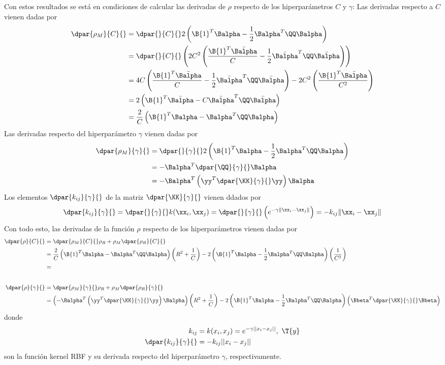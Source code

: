 %
Con estos resultados se está en condiciones de calcular las derivadas de
$\rho$ respecto de los hiperparámetros $C$ y $\gamma$:
Las derivadas respecto a $C$ vienen dadas por
%
\begin{align}
    \dpar{\rho_M}{C}{}
    &= \dpar{}{C}{}2\left(  \B{1}^T\Balpha-\frac{1}{2}\Balpha^T\QQ\Balpha \right) \\
    &= \dpar{}{C}{}\left( 2C^2\left(\frac{\B{1}^T\bar{\Balpha}}{C} -
    \frac{1}{2}\bar{\Balpha}^T\QQ\bar{\Balpha}\right)
    \right) \\
    &= 4C \left(\frac{\B{1}^T\bar{\Balpha}}{C} -
    \frac{1}{2}\bar{\Balpha}^T\QQ\bar{\Balpha}\right) - 2C^2 \left(\frac{\B{1}^T\bar{\Balpha}}{C^2} \right) \\
    &= 2\left(\B{1}^T\bar{\Balpha} - C \bar{\Balpha}^T\QQ\bar{\Balpha}\right) \\
    &= \frac{2}{C} \left(\B{1}^T\Balpha - \Balpha^T\QQ\Balpha\right)
\end{align}
%
Las derivadas respecto del hiperparámetro $\gamma$ vienen dadas por
%
\begin{align}
    \dpar{\rho_M}{\gamma}{}
    &= \dpar{}{\gamma}{} 2\left(  \B{1}^T\Balpha-\frac{1}{2}\Balpha^T\QQ\Balpha \right) \\
    &= - \Balpha^T \dpar{\QQ}{\gamma}{}\Balpha \\
    & = - \Balpha^T \left(\yy^T \dpar{\KK}{\gamma}{}\yy\right) \Balpha
\end{align}
%
Los elementos $\dpar{k_{ij}}{\gamma}{}$ de la matriz $\dpar{\KK}{\gamma}{}$
vienen ddados por
%
\begin{align}
  \dpar{k_{ij}}{\gamma}{}
  = \dpar{}{\gamma}{}k(\xx_i,\xx_j)
  = \dpar{}{\gamma}{} \left(e^{-\gamma\|\xx_i-\xx_j\|}\right)
  = -k_{ij}\|\xx_i-\xx_j\|
\end{align}
%
Con todo esto, las derivadas de la función $\rho$ respecto de los
hiperparámetros vienen dadas por
%
\begin{align*}
    \dpar{\rho}{C}{} &= \dpar{\rho_M}{C}{} \rho_R + \rho_M \dpar{\rho_R}{C}{} \\
    &= \frac{2}{C} \left(\B{1}^T\Balpha - \Balpha^T\QQ\Balpha\right) \left( R^2 + \frac{1}{C} \right)
    - 2\left(  \B{1}^T\Balpha-\frac{1}{2}\Balpha^T\QQ\Balpha \right)
    \left( \frac{1}{C^2} \right)\\
    &=
  \\[2em]
    \dpar{\rho}{\gamma}{} &= \dpar{\rho_M}{\gamma}{} \rho_R + \rho_M \dpar{\rho_R}{\gamma}{}\\
    &= \left( - \Balpha^T \left(\yy^T \dpar{\KK}{\gamma}{}\yy\right) \Balpha \right)
    \left( R^2 + \frac{1}{C} \right)
    - 2\left(  \B{1}^T\Balpha-\frac{1}{2}\Balpha^T\QQ\Balpha \right)
    \left( \Bbeta^T \dpar{\KK}{\gamma}{} \Bbeta \right)
\end{align*}
%
donde
%
\begin{align}
  k_{ij}&=k(x_i,x_j)=e^{-\gamma||x_i-x_j||},\,\, \T{y} \\
  \dpar{k_{ij}}{\gamma}{}&=-k_{ij}||x_i-x_j||
\end{align}
%
son la función kernel RBF y su derivada respecto del hiperparámetro $\gamma$,
respectivamente.

